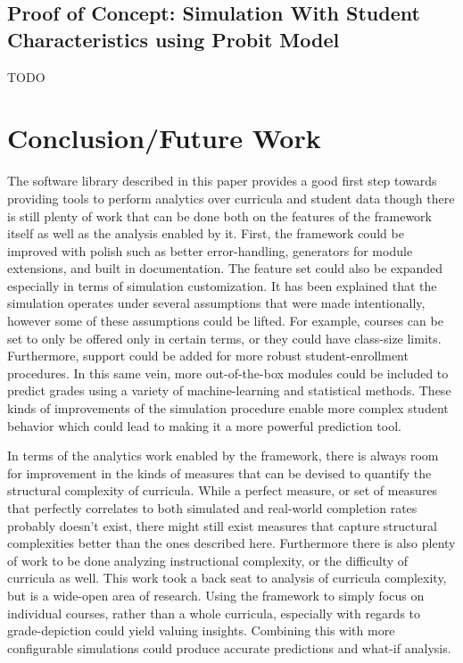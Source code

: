 \documentclass[botnum, fleqn]{unmeethesis}
\begin{document}
  \section{Proof of Concept: Simulation With Student Characteristics using Probit Model}
    TODO



\chapter{Conclusion/Future Work}
  The software library described in this paper provides a good first step towards providing tools to perform analytics over curricula and student data though there is still plenty of work that can be done both on the features of the framework itself as well as the analysis enabled by it. First, the framework could be improved with polish such as better error-handling, generators for module extensions, and built in documentation. The feature set could also be expanded especially in terms of simulation customization. It has been explained that the simulation operates under several assumptions that were made intentionally, however some of these assumptions could be lifted. For example, courses can be set to only be offered only in certain terms, or they could have class-size limits. Furthermore, support could be added for more robust student-enrollment procedures. In this same vein, more out-of-the-box modules could be included to predict grades using a variety of machine-learning and statistical methods. These kinds of improvements of the simulation procedure enable more complex student behavior which could lead to making it a more powerful prediction tool.

  In terms of the analytics work enabled by the framework, there is always room for improvement in the kinds of measures that can be devised to quantify the structural complexity of curricula. While a perfect measure, or set of measures that perfectly correlates to both simulated and real-world completion rates probably doesn't exist, there might still exist measures that capture structural complexities better than the ones described here. Furthermore there is also plenty of work to be done analyzing instructional complexity, or the difficulty of curricula as well. This work took a back seat to analysis of curricula complexity, but is a wide-open area of research. Using the framework to simply focus on individual courses, rather than a whole curricula, especially with regards to grade-depiction could yield valuing insights. Combining this with more configurable simulations could produce accurate predictions and what-if analysis.
\end{document}
